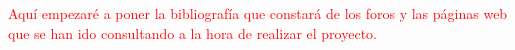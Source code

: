 \textcolor{red}{Aquí empezaré a poner la bibliografía que constará de los foros y las páginas web que se han ido consultando a la hora de realizar el proyecto.}